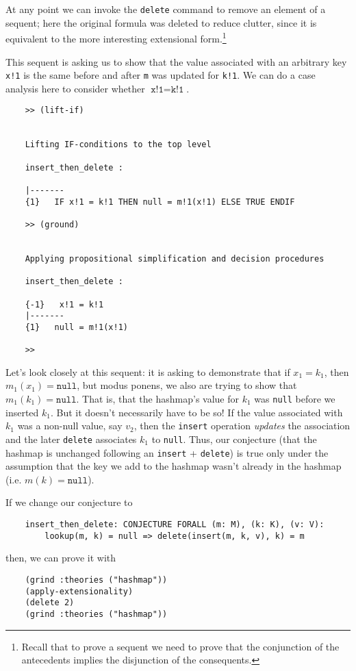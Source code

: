 At any point we can invoke the \texttt{delete} command to remove an element of a sequent; here the original formula was deleted to reduce clutter, since it is equivalent to the  more interesting extensional form.\footnote{%
	Recall that to prove a sequent we need to prove that the conjunction of the antecedents implies the disjunction of the consequents.
}

This sequent is asking us to show that the value associated with an arbitrary key \texttt{x!1} is the same before and after \texttt{m} was updated for \texttt{k!1}.
We can do a case analysis here to consider whether $\texttt{x!1} = \texttt{k!1}$.

\begin{verbatim}
	>> (lift-if)
	
	
	Lifting IF-conditions to the top level
	
	insert_then_delete :
	
	|-------
	{1}   IF x!1 = k!1 THEN null = m!1(x!1) ELSE TRUE ENDIF
	
	>> (ground)
	
	
	Applying propositional simplification and decision procedures
	
	insert_then_delete :
	
	{-1}   x!1 = k!1
	|-------
	{1}   null = m!1(x!1)
	
	>> 
\end{verbatim}

Let's look closely at this sequent: it is asking to demonstrate that if $x_1 = k_1$, then $m_1(x_1) = \texttt{null}$, but modus ponens, we also are trying to show that $m_1(k_1) = \texttt{null}$.
That is, that the hashmap's value for $k_1$ was \texttt{null} before we inserted $k_1$.
But it doesn't necessarily have to be so!
If the value associated with $k_1$ was a non-null value, say $v_2$, then the \texttt{insert} operation \emph{updates} the association and the later \texttt{delete} associates $k_1$ to \texttt{null}.
Thus, our conjecture (that the hashmap is unchanged following an \texttt{insert} + \texttt{delete}) is true only under the assumption that the key we add to the hashmap wasn't already in the hashmap (i.e. $m(k) = \texttt{null}$).

If we change our conjecture to
\begin{verbatim}
	insert_then_delete: CONJECTURE FORALL (m: M), (k: K), (v: V):
	    lookup(m, k) = null => delete(insert(m, k, v), k) = m
\end{verbatim}
then, we can prove it with
\begin{verbatim}
	(grind :theories ("hashmap"))
	(apply-extensionality)
	(delete 2)
	(grind :theories ("hashmap"))
\end{verbatim}


